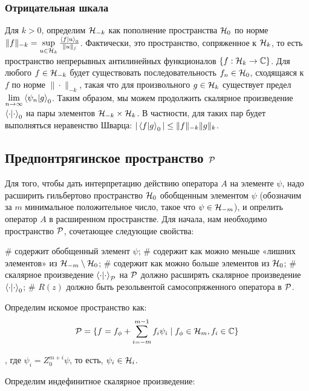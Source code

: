 \subsubsection{Отрицательная шкала}
Для $k > 0$, определим $\mathcal{H}_{-k}$ как пополнение пространства $\mathcal{H}_{0}$ по норме $\|f \|_{-k} = \sup\limits_{u \in \hilb{k}} \frac{\ip{f}{u}_0}{\|u\|_j}$. Фактически, это пространство, сопряженное к $\mathcal{H}_{k}$, то есть пространство непрерывных антилинейных функционалов $\{ f: \mathcal{H}_{k} \to \mathbb{C} \}$. Для любого $f \in \mathcal{H}_{-k}$ будет существовать последовательность $f_n \in \mathcal{H}_{0}$, сходящаяся к $f$ по норме $\|\cdot\|_{-k}$, такая что для произвольного $g \in \mathcal{H}_{k}$ существует предел $\lim\limits_{n \to \infty} \ip{\psi_n}{g}_0$. Таким образом, мы можем продолжить скалярное произведение $\ipcdot_0$ на пары элементов $\mathcal{H}_{-k} \times \mathcal{H}_{k}$. В частности, для таких пар будет выполняться неравенство Шварца: $|\ip{f}{g}_0| \le \|f\|_{-k} \|g\|_k$.

\subsection{Предпонтрягинское пространство $\mathcal{P}$}
Для того, чтобы дать интерпретацию действию оператора $A$ на элементе $\psi$, надо расширить гильбертово пространство $\mathcal{H}_{0}$ обобщенным элементом $\psi$ (обозначим за $m$ минимальное положительное число, такое что $\psi \in \mathcal{H}_{-m}$), и опрелить оператор $A$ в расширенном пространстве. Для начала, нам необходимо пространство $\mathcal{P}$, сочетающее следующие свойства:

\begin{elist}
# содержит обобщенный элемент $\psi$;
# содержит как можно меньше «лишних элементов» из  $\mathcal{H}_{-m} \setminus \mathcal{H}_{0}$;
# содержит как можно больше элементов из $\mathcal{H}_{0}$;
# скалярное произведение $\ipcdot_\mcP$ на $\mathcal{P}$ должно расширять скалярное произведение $\ipcdot_0$;
# $R(z)$ должно быть резольвентой самосопряженного оператора в $\mathcal{P}$.
\end{elist}

Определим искомое пространство как:
\[
\mathcal{P} = 
\{ f = f_\phi + \sum\limits_{i = -m}^{m - 1} f_i \psi_i \mid f_\phi \in \mathcal{H}_{m}, f_i \in \mathbb{C}\}
\]

, где $\psi_i = Z_0^{m + i} \psi$, то есть, $\psi_i \in \mathcal{H}_{i}$.

Определим индефинитное скалярное произведение:

